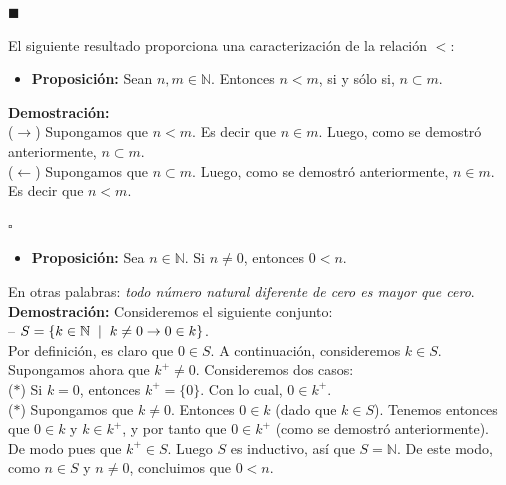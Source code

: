 \documentclass[10 pt]{article}
\begin{document}
\begin{flushright}
    $\blacksquare$
\end{flushright}

\Large{El siguiente resultado proporciona una caracterización de la relación $<$:} \\

\begin{itemize}
    \item \Large{\textbf{Proposición:} Sean $n,m \in \mathbb N$. Entonces $n<m$, si y sólo si, $n \subset m$.} \\
\end{itemize}

\Large{\textbf{Demostración:} \\

($\rightarrow$) Supongamos que $n<m$. Es decir que $n \in m$. Luego, como se demostró anteriormente, $n \subset m$. \\

($\leftarrow$) Supongamos que $n \subset m$. Luego, como se demostró anteriormente, $n \in m$. Es decir que $n<m$.} \\

\begin{flushright}
    $\square$
\end{flushright}

\begin{itemize}
    \item \Large{\textbf{Proposición:} Sea $n \in \mathbb N$. Si $n \neq 0$, entonces $0<n$.} \\
\end{itemize}

\Large{En otras palabras: \textit{todo número natural diferente de cero es mayor que cero}.} \\

\Large{\textbf{Demostración:} Consideremos el siguiente conjunto: \\

-- $S=\{k \in \mathbb N \hspace{0.2 cm}|\hspace{0.2 cm}k \neq 0 \rightarrow 0 \in k \}$. \\

Por definición, es claro que $0 \in S$. A continuación, consideremos $k \in S$. Supongamos ahora que $k^+ \neq 0$. Consideremos dos casos: \\

($\ast$) Si $k=0$, entonces $k^+=\{0\}$. Con lo cual, $0 \in k^+$. \\

($\ast$) Supongamos que $k \neq 0$. Entonces $0 \in k$ (dado que $k \in S$). Tenemos entonces que $0 \in k$ y $k \in k^+$, y por tanto que $0 \in k^+$ (como se demostró anteriormente). \\

De modo pues que $k^+ \in S$. Luego $S$ es inductivo, así que $S=\mathbb N$. De este modo, como $n \in S$ y $n \neq 0$, concluimos que $0<n$.} \\
\end{document}
